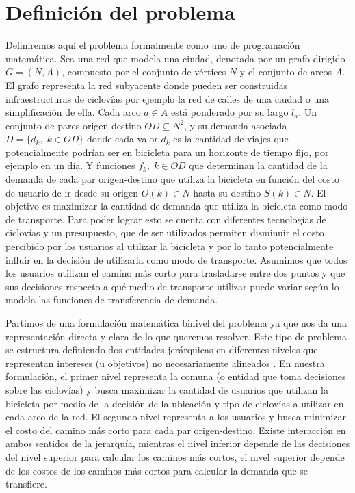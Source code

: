 \chapter{Definición del problema}
\label{sect:problemdefinition}

Definiremos aquí el problema formalmente como uno de programación matemática. Sea una red que modela una ciudad, denotada por un grafo dirigido $G=(N,A)$, compuesto por el conjunto de vértices $N$ y el conjunto de arcos $A$. El grafo representa la red subyacente donde pueden ser construidas infraestructuras de ciclovías por ejemplo la red de calles de una ciudad o una simplificación de ella. Cada arco $a \in A$ está ponderado por su largo $l_a$. Un conjunto de pares origen-destino $OD \subseteq N^2$, y su demanda asociada $D = \{d_k,\; k \in OD\}$ donde cada valor $d_k$ es la cantidad de viajes que potencialmente podrían ser en bicicleta para un horizonte de tiempo fijo, por ejemplo en un día. Y funciones $f_k,\;k \in OD$ que determinan la cantidad de la demanda de cada par origen-destino que utiliza la bicicleta en función del costo de usuario de ir desde su origen $O(k) \in N$ hasta su destino $S(k) \in N$. El objetivo es maximizar la cantidad de demanda que utiliza la bicicleta como modo de transporte. Para poder lograr esto se cuenta con diferentes tecnologías de ciclovías y un presupuesto, que de ser utilizados permiten disminuir el costo percibido por los usuarios al utilizar la bicicleta y por lo tanto potencialmente influir en la decisión de utilizarla como modo de transporte. Asumimos que todos los usuarios utilizan el camino más corto para trasladarse entre dos puntos y que sus decisiones respecto a qué medio de transporte utilizar puede variar según lo modela las funciones de transferencia de demanda.

Partimos de una formulación matemática binivel del problema ya que nos da una representación directa y clara de lo que queremos resolver. Este tipo de problema se estructura definiendo dos entidades jerárquicas en diferentes niveles que representan intereses (u objetivos) no necesariamente alineados \parencite{bardbook}. En nuestra formulación, el primer nivel representa la comuna (o entidad que toma decisiones sobre las ciclovías) y busca maximizar la cantidad de usuarios que utilizan la bicicleta por medio de la decisión de la ubicación y tipo de ciclovías a utilizar en cada arco de la red. El segundo nivel representa a los usuarios y busca minimizar el costo del camino más corto para cada par origen-destino. Existe interacción en ambos sentidos de la jerarquía, mientras el nivel inferior depende de las decisiones del nivel superior para calcular los caminos más cortos, el nivel superior depende de los costos de los caminos más cortos para calcular la demanda que se transfiere.

